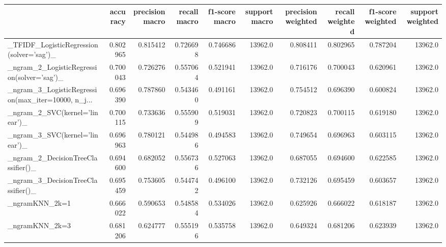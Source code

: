 \begin{tabular}{lrrrrrrrrr}
\toprule
{} &  accuracy &  precision macro &  recall macro &  f1-score macro &  support macro &  precision weighted &  recall weighted &  f1-score weighted &  support weighted \\
\midrule
\_TFIDF\_LogisticRegression(solver='sag')\_           &  0.802965 &         0.815412 &      0.726698 &        0.746686 &        13962.0 &            0.808411 &         0.802965 &           0.787204 &           13962.0 \\
\_ngram\_2\_LogisticRegression(solver='sag')\_         &  0.700043 &         0.726276 &      0.557064 &        0.521941 &        13962.0 &            0.716176 &         0.700043 &           0.620961 &           13962.0 \\
\_ngram\_3\_LogisticRegression(max\_iter=10000, n\_j... &  0.696390 &         0.787860 &      0.543460 &        0.491161 &        13962.0 &            0.754512 &         0.696390 &           0.600824 &           13962.0 \\
\_ngram\_2\_SVC(kernel='linear')\_                     &  0.700115 &         0.733636 &      0.555909 &        0.519031 &        13962.0 &            0.720823 &         0.700115 &           0.619180 &           13962.0 \\
\_ngram\_3\_SVC(kernel='linear')\_                     &  0.696963 &         0.780121 &      0.544986 &        0.494583 &        13962.0 &            0.749654 &         0.696963 &           0.603115 &           13962.0 \\
\_ngram\_2\_DecisionTreeClassifier()\_                 &  0.694600 &         0.682052 &      0.556736 &        0.527063 &        13962.0 &            0.687055 &         0.694600 &           0.622585 &           13962.0 \\
\_ngram\_3\_DecisionTreeClassifier()\_                 &  0.695459 &         0.753605 &      0.544742 &        0.496100 &        13962.0 &            0.732126 &         0.695459 &           0.603657 &           13962.0 \\
\_ngramKNN\_2k=1                                     &  0.666022 &         0.590653 &      0.548584 &        0.534026 &        13962.0 &            0.625926 &         0.666022 &           0.618187 &           13962.0 \\
\_ngramKNN\_2k=3                                     &  0.681206 &         0.624777 &      0.555196 &        0.535758 &        13962.0 &            0.649324 &         0.681206 &           0.623939 &           13962.0 \\

\end{tabular}
